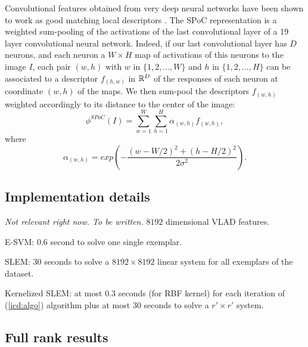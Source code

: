 Convolutional features obtained from very deep neural networks have been shown to work as good matching local descriptors \cite{SimonZisser15}. 
The SPoC representation \cite{babenko15} is a weighted sum-pooling of the activations of the last convolutional layer of a 19 layer convolutional neural network. 
Indeed, if our last convolutional layer has $D$ neurons, and each neuron a $W\times H$ map of activations of this neurons to the image $I$, 
each pair $(w,h)$ with $w$ in $\{1,2,..., W\}$ and $h$ in $\{1,2,...,H\}$ can be associated to a descriptor $f_{(h,w)}$ in $\mathbb R^D$ of the responses of each neuron at coordinate $(w,h)$ of the maps. 
We then sum-pool the descriptors $f_{(w,h)}$ weighted accordingly to its distance to the center of the image:
\begin{equation}
    \phi^{SPoC}(I) = \sum_{w=1}^W\sum_{h=1}^H \alpha_{(w,h)}f_{(w,h)},
\end{equation}
where
\begin{equation}
    \alpha_{(w,h)} = exp \left(-\dfrac{(w-W/2)^2+(h-H/2)^2}{2\sigma^2}\right).
\end{equation}



\subsection{Implementation details}
\emph{\color{red} Not relevant right now.  To be written.}
$8192$ dimensional VLAD features.

E-SVM: $0.6$ second to solve one single exemplar.

SLEM: $30$ seconds to solve a $8192\times 8192$ linear system for all exemplars of the dataset.

Kernelized SLEM: at most $0.3$ seconds (for RBF kernel) for each iteration of (\ref{icd:algo}) algorithm plus at most $30$ seconds to solve a $r'\times r'$ system.


\subsection{Full rank results}

